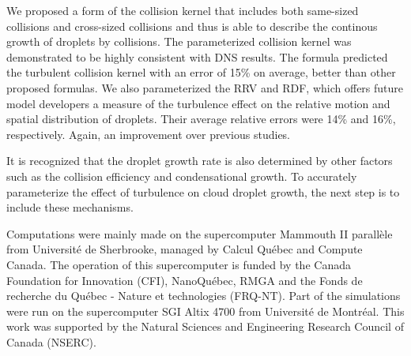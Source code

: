 We proposed a form of the collision kernel that includes both same-sized collisions and cross-sized collisions and thus is able to describe the continous growth of droplets by collisions. The parameterized collision kernel was demonstrated to be highly consistent with DNS results. The formula predicted the turbulent collision kernel with an error of 15\% on average, better than other proposed formulas. We also parameterized the RRV and RDF, which offers future model developers a measure of the turbulence effect on the relative motion and spatial distribution of droplets. Their average relative errors were 14\% and 16\%, respectively. Again, an improvement over previous studies. 

It is recognized that the droplet growth rate is also determined by other factors such as the collision efficiency and condensational growth. To accurately parameterize the effect of turbulence on cloud droplet growth, the next step is to include these mechanisms. 

\acknowledgments
Computations were mainly made on the supercomputer Mammouth II parall\`{e}le from Universit\'{e} de Sherbrooke, managed by Calcul Qu\'{e}bec and Compute Canada. The operation of this supercomputer is funded by the Canada Foundation for Innovation (CFI), NanoQu\'{e}bec, RMGA and the Fonds de recherche du Qu\'{e}bec - Nature et technologies (FRQ-NT). Part of the simulations were run on the supercomputer SGI Altix 4700 from Universit\'{e} de Montr\'{e}al. This work was supported by the Natural Sciences and Engineering Research Council of Canada (NSERC). 

\cleardoublepage 
